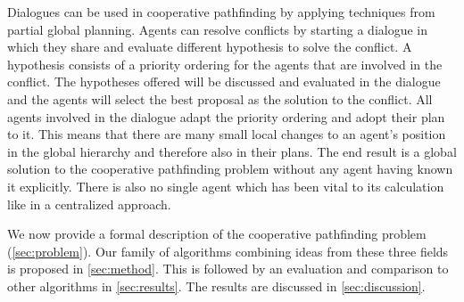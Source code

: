 Dialogues can be used in cooperative pathfinding by applying techniques from
partial global planning. Agents can resolve conflicts by starting a dialogue in
which they share and evaluate different hypothesis to solve the conflict. A
hypothesis consists of a priority ordering for the agents that are involved in
the conflict. The hypotheses offered will be discussed and evaluated in the
dialogue and the agents will select the best proposal as the solution
to the conflict. All agents involved in the dialogue adapt the priority
ordering and adopt their plan to it. This means that there are many small local
changes to an agent's position in the global hierarchy and therefore also in
their plans. The end result is a global solution to the cooperative pathfinding
problem without any agent having known it explicitly. There is also no single
agent which has been vital to its calculation like in a centralized approach.

We now provide a formal description of the cooperative pathfinding problem 
(\autoref{sec:problem}). Our family 
of algorithms combining ideas from these three fields is proposed in 
\autoref{sec:method}. This is followed by an evaluation and comparison to other 
algorithms in \autoref{sec:results}. The results are discussed in 
\autoref{sec:discussion}.
